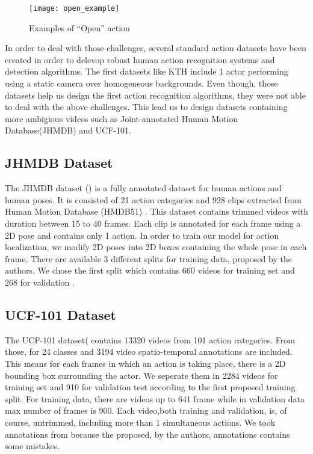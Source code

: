 \begin{figure}[h]
  \centering
  \texttt{[image: open\_example]}
  \caption{Examples of ``Open'' action}
  \label{fig:open_example}

\end{figure}

In order to deal with those challenges, several standard action datasets have been created in order to delevop
robust human action recognition systems and detection algorithms.
The first datasets like KTH\cite{} include 1 actor performing using a static camera over homogeneous backgrounds.
Even though, those datasets help us design the first action recognition algorithms, they were not able to deal with the above
challenges.
This lead us to design datasets containing more ambigious videos such as Joint-annotated Human Motion Database(JHMDB)\cite{}
and UCF-101\cite{}.
\subsection{JHMDB Dataset}
The JHMDB dataset (\cite{Jhuang:ICCV:2013}) is a fully annotated dataset for human actions and human poses. It is consisted of 21 action categories and 928
clips extracted from Human Motion Database (HMDB51) \cite{Kuehne11}. This dataset contains trimmed videos with duration between
15 to 40 frames. Each clip is annotated for each frame using a 2D pose and contains only 1 action.
In order to train our model for action localization, we modify 2D poses into 2D boxes containing the whole pose in each frame.
There are available 3 different splits for training data, proposed by the authors. We chose the first split which contains 660
videos for training set and 268 for validation . 

\subsection{UCF-101 Dataset}
The UCF-101 dataset(\cite{soomro2012ucf101} contains 13320 videos from 101 action categories.
From those, for 24 classes and 3194 video spatio-temporal annotations are included. This means for each frames in which an action is taking place,
there is a 2D bounding box surrounding the actor.  We seperate them in 2284 videos for training set and 910 for validation test according to the
first proposed training split. For training data, there are videos up to 641 frame while in validation data max number of frames is 900.
Each video,both training and validation, is, of course, untrimmed,  including more than 1 simultaneous actions. We took annotations from
\cite{singh2016online} because the proposed, by the authors, annotations contains some mistakes.


